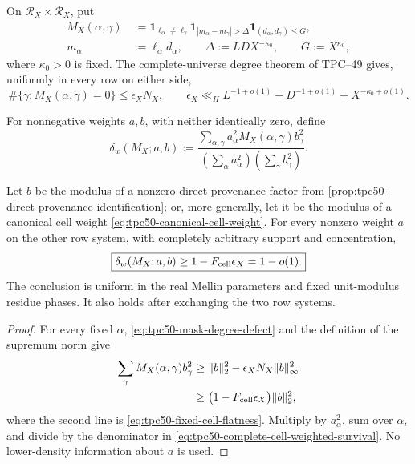 On \(\mathcal R_X\times\mathcal R_X\), put
\begin{align}
 M_X(\alpha,\gamma)
 &:=
 \mathbf 1_{\ell_\alpha\ne\ell_\gamma}
 \mathbf 1_{|m_\alpha-m_\gamma|>\Delta}
 \mathbf 1_{(d_\alpha,d_\gamma)\leq G},
 \label{eq:tpc50-static-mask}\\
 m_\alpha&:=\ell_\alpha d_\alpha,
 \qquad
 \Delta:=LDX^{-\kappa_0},
 \qquad
 G:=X^{\kappa_0},
 \label{eq:tpc50-static-mask-scales}
\end{align}
where \(\kappa_0>0\) is fixed.  The complete-universe degree theorem
of TPC--49 \citep{WangTPC49}
gives, uniformly in every row on either side,
\begin{equation}
 \#\{\gamma:M_X(\alpha,\gamma)=0\}
 \leq\epsilon_XN_X,
 \qquad
 \epsilon_X\ll_H
 L^{-1+o(1)}+D^{-1+o(1)}+X^{-\kappa_0+o(1)}.
 \label{eq:tpc50-mask-degree-defect}
\end{equation}

For nonnegative weights \(a,b\), with neither identically zero, define
\begin{equation}
 \delta_w(M_X;a,b)
 :=\frac{\sum_{\alpha,\gamma}
 a_\alpha^2M_X(\alpha,\gamma)b_\gamma^2}
 {\left(\sum_\alpha a_\alpha^2\right)
  \left(\sum_\gamma b_\gamma^2\right)}.
 \label{eq:tpc50-complete-cell-weighted-survival}
\end{equation}

\begin{theorem}
\label{thm:tpc50-canonical-cell-survival}
Let \(b\) be the modulus of a nonzero direct provenance factor from
\cref{prop:tpc50-direct-provenance-identification}; or, more generally,
let it be the modulus of a canonical cell weight
\eqref{eq:tpc50-canonical-cell-weight}.
For every nonzero weight \(a\)
on the other row system, with completely arbitrary support and
concentration,
\begin{equation}
 \boxed{
 \delta_w(M_X;a,b)
 \geq1-F_{\rm cell}\epsilon_X
 =1-o(1).}
 \label{eq:tpc50-canonical-survival}
\end{equation}
The conclusion is uniform in the real Mellin parameters and fixed
unit-modulus residue phases.  It also holds after exchanging the two
row systems.
\end{theorem}

\begin{proof}
For every fixed \(\alpha\), \eqref{eq:tpc50-mask-degree-defect} and the
definition of the supremum norm give
\begin{align}
 \sum_\gamma M_X(\alpha,\gamma)b_\gamma^2
 &\geq\|b\|_2^2-\epsilon_XN_X\|b\|_\infty^2
 \notag\\
 &\geq
 \bigl(1-F_{\rm cell}\epsilon_X\bigr)\|b\|_2^2,
 \label{eq:tpc50-rowwise-weighted-survival}
\end{align}
where the second line is
\eqref{eq:tpc50-fixed-cell-flatness}.  Multiply by \(a_\alpha^2\), sum
over \(\alpha\), and divide by the denominator in
\eqref{eq:tpc50-complete-cell-weighted-survival}.  No lower-density
information about \(a\) is used.
\end{proof}


